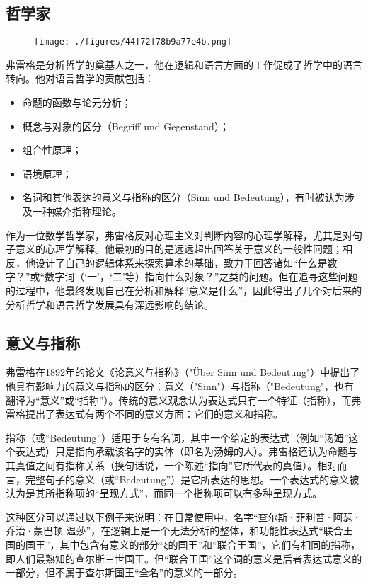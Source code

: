 \subsection{哲学家}
\begin{figure}[ht]
\centering
\texttt{[image: ./figures/44f72f78b9a77e4b.png]}
\caption{} \label{fig_Gottlo_3}
\end{figure}
弗雷格是分析哲学的奠基人之一，他在逻辑和语言方面的工作促成了哲学中的语言转向。他对语言哲学的贡献包括：
\begin{itemize}
\item 命题的函数与论元分析；
\item 概念与对象的区分（Begriff und Gegenstand）；
\item 组合性原理；
\item 语境原理；
\item 名词和其他表达的意义与指称的区分（Sinn und Bedeutung），有时被认为涉及一种媒介指称理论。
\end{itemize}
作为一位数学哲学家，弗雷格反对心理主义对判断内容的心理学解释，尤其是对句子意义的心理学解释。他最初的目的是远远超出回答关于意义的一般性问题；相反，他设计了自己的逻辑体系来探索算术的基础，致力于回答诸如“什么是数字？”或“数字词（‘一’，‘二’等）指向什么对象？”之类的问题。但在追寻这些问题的过程中，他最终发现自己在分析和解释“意义是什么”，因此得出了几个对后来的分析哲学和语言哲学发展具有深远影响的结论。
\subsection{意义与指称}  
弗雷格在1892年的论文《论意义与指称》（"Über Sinn und Bedeutung"）中提出了他具有影响力的意义与指称的区分：意义（"Sinn"）与指称（"Bedeutung"，也有翻译为“意义”或“指称”）。传统的意义观念认为表达式只有一个特征（指称），而弗雷格提出了表达式有两个不同的意义方面：它们的意义和指称。

指称（或“Bedeutung”）适用于专有名词，其中一个给定的表达式（例如“汤姆”这个表达式）只是指向承载该名字的实体（即名为汤姆的人）。弗雷格还认为命题与其真值之间有指称关系（换句话说，一个陈述“指向”它所代表的真值）。相对而言，完整句子的意义（或“Bedeutung”）是它所表达的思想。一个表达式的意义被认为是其所指称项的“呈现方式”，而同一个指称项可以有多种呈现方式。

这种区分可以通过以下例子来说明：在日常使用中，名字“查尔斯·菲利普·阿瑟·乔治·蒙巴顿-温莎”，在逻辑上是一个无法分析的整体，和功能性表达式“联合王国的国王”，其中包含有意义的部分“ξ的国王”和“联合王国”，它们有相同的指称，即人们最熟知的查尔斯三世国王。但“联合王国”这个词的意义是后者表达式意义的一部分，但不属于查尔斯国王“全名”的意义的一部分。

